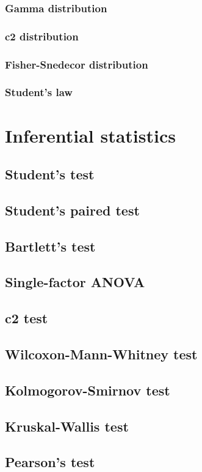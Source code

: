\documentclass{report}
\begin{document}
		\subsection{Gamma distribution}
		\subsection{c2 distribution}
		\subsection{Fisher-Snedecor distribution}
		\subsection{Student’s law}

\chapter{Inferential statistics}\label{chap:inferential}
	\section{Student’s test}
	\section{Student’s paired test}
	\section{Bartlett’s test}
	\section{Single-factor ANOVA}
	\section{c2 test}
	\section{Wilcoxon-Mann-Whitney test}
	\section{Kolmogorov-Smirnov test}
	\section{Kruskal-Wallis test}
	\section{Pearson’s test}
\end{document}
